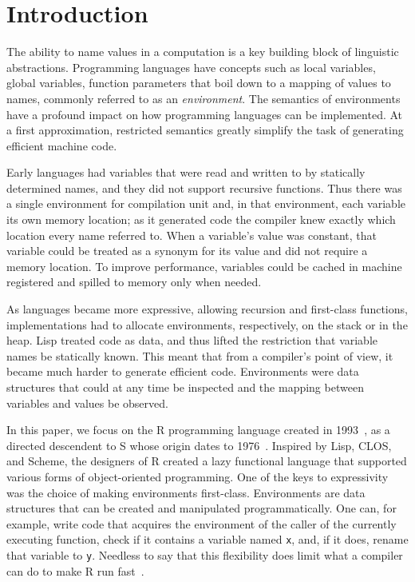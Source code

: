 \documentclass[10pt,review,sigplan,anonymous=true,authorversion=true,nonacm=true]{acmart}
\renewcommand{\c}[1]{\lstinline |#1|\xspace}
\begin{document}

\maketitle
\section{Introduction}

The ability to name values in a computation is a key building block of
linguistic abstractions. Programming languages have concepts such as local
variables, global variables, function parameters that boil down to a mapping
of values to names, commonly referred to as an \emph{environment}. The semantics of
environments have a profound impact on how programming languages can be
implemented. At a first approximation, restricted semantics greatly simplify the
task of generating efficient machine code.

Early languages had variables that were read and written to by statically
determined names, and they did not support recursive functions. Thus there was a
single environment for compilation unit and, in that environment, each variable
its own memory location; as it generated code the compiler knew exactly which
location every name referred to. When a variable's value was constant, that
variable could be treated as a synonym for its value and did not require a
memory location. To improve performance, variables could be cached in machine
registered and spilled to memory only when needed.

As languages became more expressive, allowing recursion and first-class
functions, implementations had to allocate environments, respectively, on the
stack or in the heap. Lisp treated code as data, and thus lifted the restriction
that variable names be statically known. This meant that from a compiler's point
of view, it became much harder to generate efficient code. Environments were
data structures that could at any time be inspected and the mapping between
variables and values be observed.

In this paper, we focus on the R programming language created in 1993~\cite{r96}, as
a directed descendent to S whose origin dates to 1976~\cite{s88}. Inspired by Lisp,
CLOS, and Scheme, the designers of R created a lazy functional language that
supported various forms of object-oriented programming. One of the keys to
expressivity was the choice of making environments first-class. Environments are
data structures that can be created and manipulated programmatically. One can,
for example, write code that acquires the environment of the caller of the
currently executing function, check if it contains a variable named \c{x}, and,
if it does, rename that variable to \c{y}. Needless to say that this flexibility
does limit what a compiler can do to make R run fast~\cite{dls19}.
\end{document}
